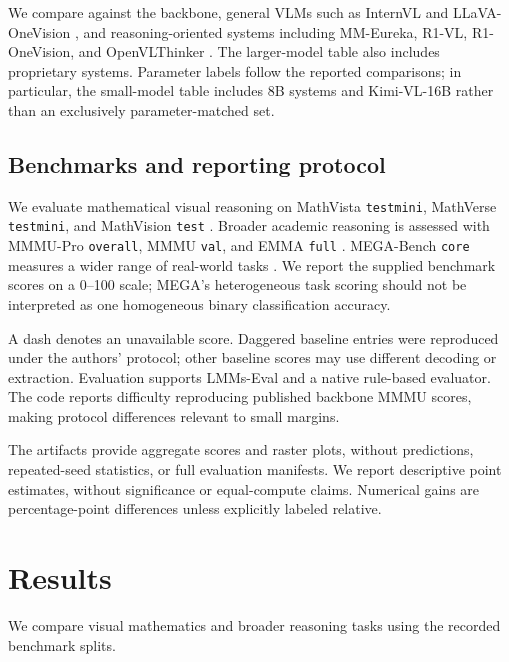 \documentclass[twocolumn]{article}
\begin{document}
We compare against the backbone, general VLMs such as InternVL and LLaVA-OneVision \citep{internvl_2_5,llavaov}, and reasoning-oriented systems including MM-Eureka, R1-VL, R1-OneVision, and OpenVLThinker \citep{mmeureka,r1vl,R1OneVision,OpenVLThinker}. The larger-model table also includes proprietary systems. Parameter labels follow the reported comparisons; in particular, the small-model table includes 8B systems and Kimi-VL-16B rather than an exclusively parameter-matched set.

\subsection{Benchmarks and reporting protocol}

We evaluate mathematical visual reasoning on MathVista \texttt{testmini}, MathVerse \texttt{testmini}, and MathVision \texttt{test} \citep{mathvista,mathverse,mathvision}. Broader academic reasoning is assessed with MMMU-Pro \texttt{overall}, MMMU \texttt{val}, and EMMA \texttt{full} \citep{mmmupro,yue2024mmmu,emma}. MEGA-Bench \texttt{core} measures a wider range of real-world tasks \citep{chen2024mega}. We report the supplied benchmark scores on a 0--100 scale; MEGA's heterogeneous task scoring should not be interpreted as one homogeneous binary classification accuracy.

A dash denotes an unavailable score. Daggered baseline entries were reproduced under the authors' protocol; other baseline scores may use different decoding or extraction. Evaluation supports LMMs-Eval \citep{zhang2024lmmsevalrealitycheckevaluation} and a native rule-based evaluator. The code reports difficulty reproducing published backbone MMMU scores, making protocol differences relevant to small margins.

The artifacts provide aggregate scores and raster plots, without predictions, repeated-seed statistics, or full evaluation manifests. We report descriptive point estimates, without significance or equal-compute claims. Numerical gains are percentage-point differences unless explicitly labeled relative.

\section{Results}
\label{sec:results}

We compare visual mathematics \citep{mathvista,mathverse,mathvision} and broader reasoning tasks using the recorded benchmark splits.
\end{document}

